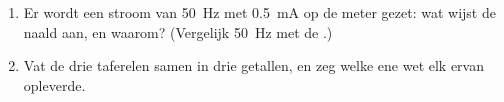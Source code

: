 \begin{problem}
\begin{enumerate}[resume]
        met $\theta$ gemeten vanaf de stand waarin het vlak van de spoel
        $\vect B$ bevat.
  \item Er wordt een stroom van \qty{50}{Hz} met  \qty{0.5}{mA} op de
        meter gezet: wat wijst de naald aan, en waarom? (Vergelijk \qty{50}{Hz}
        met de .)
  \item Vat de drie taferelen samen in drie getallen, en zeg welke ene
        wet elk ervan opleverde.
\end{enumerate}
\end{problem}
